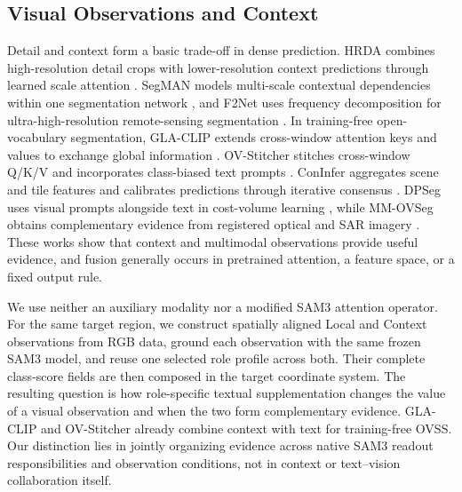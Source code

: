 \subsection{Visual Observations and Context}

Detail and context form a basic trade-off in dense prediction. HRDA combines high-resolution detail crops with lower-resolution context predictions through learned scale attention \cite{R18}. SegMAN models multi-scale contextual dependencies within one segmentation network \cite{R23}, and F2Net uses frequency decomposition for ultra-high-resolution remote-sensing segmentation \cite{R19}. In training-free open-vocabulary segmentation, GLA-CLIP extends cross-window attention keys and values to exchange global information \cite{R14}. OV-Stitcher stitches cross-window Q/K/V and incorporates class-biased text prompts \cite{R15}. ConInfer aggregates scene and tile features and calibrates predictions through iterative consensus \cite{R26}. DPSeg uses visual prompts alongside text in cost-volume learning \cite{R16}, while MM-OVSeg obtains complementary evidence from registered optical and SAR imagery \cite{R22}. These works show that context and multimodal observations provide useful evidence, and fusion generally occurs in pretrained attention, a feature space, or a fixed output rule.

We use neither an auxiliary modality nor a modified SAM3 attention operator. For the same target region, we construct spatially aligned Local and Context observations from RGB data, ground each observation with the same frozen SAM3 model, and reuse one selected role profile across both. Their complete class-score fields are then composed in the target coordinate system. The resulting question is how role-specific textual supplementation changes the value of a visual observation and when the two form complementary evidence. GLA-CLIP and OV-Stitcher already combine context with text for training-free OVSS. Our distinction lies in jointly organizing evidence across native SAM3 readout responsibilities and observation conditions, not in context or text--vision collaboration itself.

